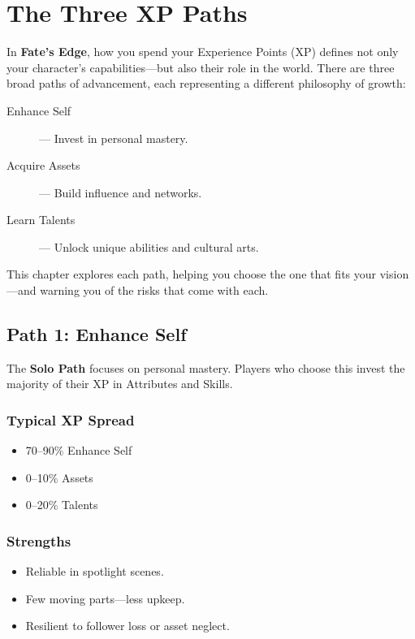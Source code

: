 
\chapter{The Three XP Paths}
\label{ch:xp-paths}

In \textbf{Fate's Edge}, how you spend your Experience Points (XP)  defines not only your character's capabilities—but also their role in the world. There are three broad paths of advancement, each representing a different philosophy of growth:

\begin{description}
  \item[Enhance Self]  — Invest in personal mastery.
  \item[Acquire Assets]  — Build influence and networks.
  \item[Learn Talents]  — Unlock unique abilities and cultural arts.
\end{description}

This chapter explores each path, helping you choose the one that fits your vision—and warning you of the risks that come with each.

\section{Path 1: Enhance Self}

The \textbf{Solo Path} focuses on personal mastery. Players who choose this invest the majority of their XP in Attributes and Skills.

\subsection*{Typical XP Spread}
\begin{itemize}
  \item 70–90\% Enhance Self
  \item 0–10\% Assets
  \item 0–20\% Talents
\end{itemize}

\subsection*{Strengths}
\begin{itemize}
  \item Reliable in spotlight scenes.
  \item Few moving parts—less upkeep.
  \item Resilient to follower loss or asset neglect.
\end{itemize}

